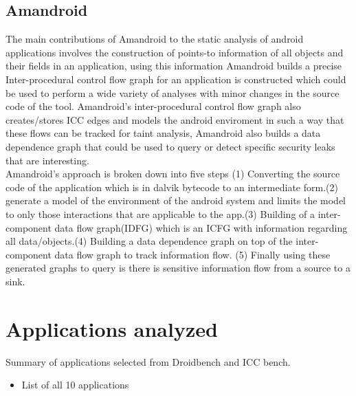 \documentclass[journal]{IEEEtran}
\begin{document}
\subsection{Amandroid}
	The main contributions of Amandroid to the static analysis of android applications involves the construction of points-to information of all objects and their fields  in an application, using this information Amandroid builds a precise Inter-procedural control flow graph for an application is constructed which could be used to perform a wide variety of analyses with minor changes in the source code of the tool. Amandroid's inter-procedural control flow graph also creates/stores ICC edges and models the android enviroment in such a way that  these flows can be tracked for taint analysis, Amandroid also builds a data dependence graph that could be used to query or detect specific security leaks that are interesting.\\
	Amandroid's approach is broken down into five steps (1) Converting the source code of the application which is in dalvik bytecode to an intermediate form.(2) generate a model of the environment of the android system and limits the model to only those interactions that are applicable to the app.(3) Building of a inter-component data flow graph(IDFG) which is an ICFG with information regarding all data/objects.(4) Building a data dependence graph on top of the inter-component data flow graph to track information flow. (5) Finally using these generated graphs to query is there is sensitive information flow from a source to a sink.\\   


\section{Applications analyzed}
	Summary of applications selected from Droidbench and ICC bench.\\



\begin{itemize}
	\item List of all 10 applications
\end{itemize}
\end{document}
